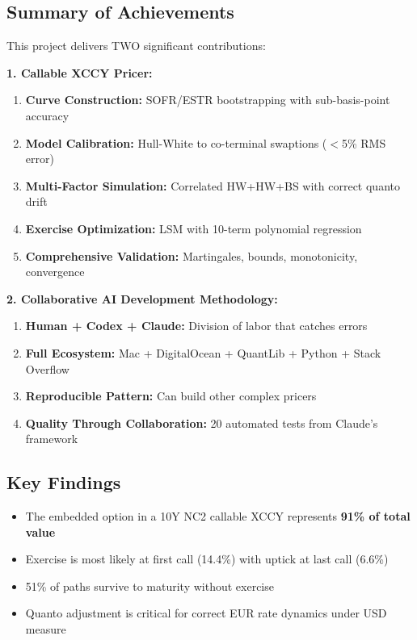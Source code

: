 \documentclass[10pt,a4paper]{article}
\begin{document}
\subsection{Summary of Achievements}

This project delivers TWO significant contributions:

\textbf{1. Callable XCCY Pricer:}
\begin{enumerate}
    \item \textbf{Curve Construction:} SOFR/ESTR bootstrapping with sub-basis-point accuracy
    \item \textbf{Model Calibration:} Hull-White to co-terminal swaptions ($<$5\% RMS error)
    \item \textbf{Multi-Factor Simulation:} Correlated HW+HW+BS with correct quanto drift
    \item \textbf{Exercise Optimization:} LSM with 10-term polynomial regression
    \item \textbf{Comprehensive Validation:} Martingales, bounds, monotonicity, convergence
\end{enumerate}

\textbf{2. Collaborative AI Development Methodology:}
\begin{enumerate}
    \item \textbf{Human + Codex + Claude:} Division of labor that catches errors
    \item \textbf{Full Ecosystem:} Mac + DigitalOcean + QuantLib + Python + Stack Overflow
    \item \textbf{Reproducible Pattern:} Can build other complex pricers
    \item \textbf{Quality Through Collaboration:} 20 automated tests from Claude's framework
\end{enumerate}

\subsection{Key Findings}

\begin{itemize}
    \item The embedded option in a 10Y NC2 callable XCCY represents \textbf{91\% of total value}
    \item Exercise is most likely at first call (14.4\%) with uptick at last call (6.6\%)
    \item 51\% of paths survive to maturity without exercise
    \item Quanto adjustment is critical for correct EUR rate dynamics under USD measure
\end{itemize}
\end{document}
